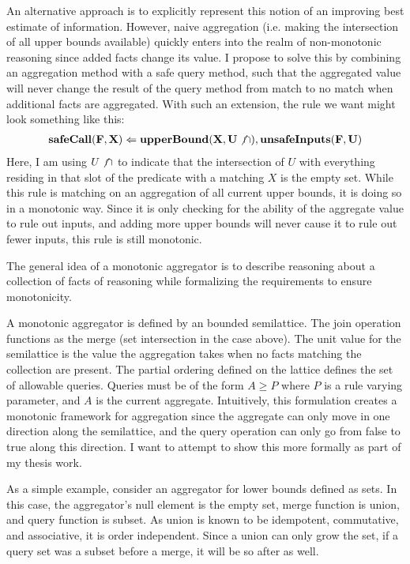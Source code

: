 An alternative approach is to explicitly represent this notion of an improving best estimate of information.
However, naive aggregation (i.e. making the intersection of all upper bounds available) quickly enters into the realm of non-monotonic reasoning since added facts change its value.
I propose to solve this by combining an aggregation method with a safe query method, such that the aggregated value will never change the result of the query method from match to no match when additional facts are aggregated.
With such an extension, the rule we want might look something like this:
\begin{gather*}
        {\bf safeCall}({\bf F}, {\bf X}) \Leftarrow {\bf upperBound}({\bf X}, {\bf U} \not \cap), {\bf unsafeInputs}({\bf F}, {\bf U})
\end{gather*}
Here, I am using $U \not \cap$ to indicate that the intersection of $U$ with everything residing in that slot of the predicate with a matching $X$ is the empty set.
While this rule is matching on an aggregation of all current upper bounds, it is doing so in a monotonic way.
Since it is only checking for the ability of the aggregate value to rule out inputs, and adding more upper bounds will never cause it to rule out fewer inputs, this rule is still monotonic.

The general idea of a monotonic aggregator is to describe reasoning about a collection of facts of reasoning while formalizing the requirements to ensure monotonicity.

A monotonic aggregator is defined by an bounded semilattice.
The join operation functions as the merge (set intersection in the case above).
The unit value for the semilattice is the value the aggregation takes when no facts matching the collection are present.
The partial ordering defined on the lattice defines the set of allowable queries.
Queries must be of the form $A \geq P$ where $P$ is a rule varying parameter, and $A$ is the current aggregate.
Intuitively, this formulation creates a monotonic framework for aggregation since the aggregate can only move in one direction along the semilattice, and the query operation can only go from false to true along this direction.
I want to attempt to show this more formally as part of my thesis work.

As a simple example, consider an aggregator for lower bounds defined as sets.
In this case, the aggregator's null element is the empty set, merge function is union, and query function is subset.
As union is known to be idempotent, commutative, and associative, it is order independent.
Since a union can only grow the set, if a query set was a subset before a merge, it will be so after as well.


